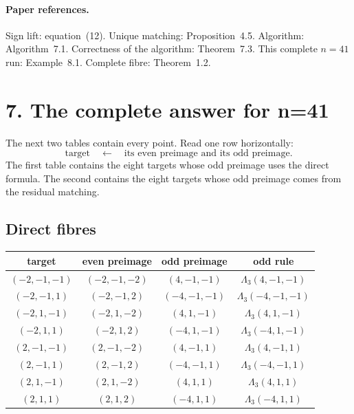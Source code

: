 \documentclass[11pt]{amsart}
\begin{document}
\paragraph{Paper references.}
Sign lift: equation~(12).  Unique matching: Proposition~4.5.  Algorithm:
Algorithm~7.1.  Correctness of the algorithm: Theorem~7.3.  This complete
\(n=41\) run: Example~8.1.  Complete fibre: Theorem~1.2.

\newpage
\section*{7. The complete answer for n=41}

The next two tables contain every point.  Read one row horizontally:
\[
 \text{target}\quad\longleftarrow\quad
 \text{its even preimage and its odd preimage}.
\]
The first table contains the eight targets whose odd preimage uses the direct
formula.  The second contains the eight targets whose odd preimage comes from
the residual matching.

\subsection*{Direct fibres}

\begin{center}
\small
\renewcommand{\arraystretch}{1.22}
\begin{tabular}{@{}c c c c@{}}
\toprule
target & even preimage & odd preimage & odd rule \\
\midrule
$(-2,-1,-1)$ & $(-2,-1,-2)$ & $(4,-1,-1)$
  & $\Lambda_3(4,-1,-1)$ \\
$(-2,-1, 1)$ & $(-2,-1, 2)$ & $(-4,-1,-1)$
  & $\Lambda_3(-4,-1,-1)$ \\
$(-2, 1,-1)$ & $(-2, 1,-2)$ & $(4, 1,-1)$
  & $\Lambda_3(4,1,-1)$ \\
$(-2, 1, 1)$ & $(-2, 1, 2)$ & $(-4,1,-1)$
  & $\Lambda_3(-4,1,-1)$ \\
$( 2,-1,-1)$ & $( 2,-1,-2)$ & $(4,-1,1)$
  & $\Lambda_3(4,-1,1)$ \\
$( 2,-1, 1)$ & $( 2,-1, 2)$ & $(-4,-1,1)$
  & $\Lambda_3(-4,-1,1)$ \\
$( 2, 1,-1)$ & $( 2, 1,-2)$ & $(4,1,1)$
  & $\Lambda_3(4,1,1)$ \\
$( 2, 1, 1)$ & $( 2, 1, 2)$ & $(-4,1,1)$
  & $\Lambda_3(-4,1,1)$ \\
\bottomrule
\end{tabular}
\end{center}
\end{document}
